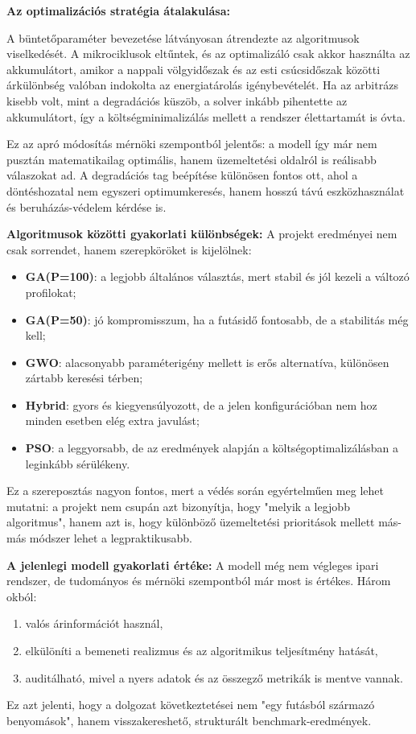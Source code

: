 \textbf{Az optimalizációs stratégia átalakulása:}

A büntetőparaméter bevezetése látványosan átrendezte az algoritmusok viselkedését. A mikrociklusok eltűntek, és az optimalizáló csak akkor használta az akkumulátort, amikor a nappali völgyidőszak és az esti csúcsidőszak közötti árkülönbség valóban indokolta az energiatárolás igénybevételét. Ha az arbitrázs kisebb volt, mint a degradációs küszöb, a solver inkább pihentette az akkumulátort, így a költségminimalizálás mellett a rendszer élettartamát is óvta.

Ez az apró módosítás mérnöki szempontból jelentős: a modell így már nem pusztán matematikailag optimális, hanem üzemeltetési oldalról is reálisabb válaszokat ad. A degradációs tag beépítése különösen fontos ott, ahol a döntéshozatal nem egyszeri optimumkeresés, hanem hosszú távú eszközhasználat és beruházás-védelem kérdése is.

\textbf{Algoritmusok közötti gyakorlati különbségek:}
A projekt eredményei nem csak sorrendet, hanem szerepköröket is kijelölnek:
\begin{itemize}
	\item \textbf{GA(P=100)}: a legjobb általános választás, mert stabil és jól kezeli a változó profilokat;
	\item \textbf{GA(P=50)}: jó kompromisszum, ha a futásidő fontosabb, de a stabilitás még kell;
	\item \textbf{GWO}: alacsonyabb paraméterigény mellett is erős alternatíva, különösen zártabb keresési térben;
	\item \textbf{Hybrid}: gyors és kiegyensúlyozott, de a jelen konfigurációban nem hoz minden esetben elég extra javulást;
	\item \textbf{PSO}: a leggyorsabb, de az eredmények alapján a költségoptimalizálásban a leginkább sérülékeny.
\end{itemize}

Ez a szereposztás nagyon fontos, mert a védés során egyértelműen meg lehet mutatni: a projekt nem csupán azt bizonyítja, hogy "melyik a legjobb algoritmus", hanem azt is, hogy különböző üzemeltetési prioritások mellett más-más módszer lehet a legpraktikusabb.

\textbf{A jelenlegi modell gyakorlati értéke:}
A modell még nem végleges ipari rendszer, de tudományos és mérnöki szempontból már most is értékes. Három okból:
\begin{enumerate}
	\item valós árinformációt használ,
	\item elkülöníti a bemeneti realizmus és az algoritmikus teljesítmény hatását,
	\item auditálható, mivel a nyers adatok és az összegző metrikák is mentve vannak.
\end{enumerate}

Ez azt jelenti, hogy a dolgozat következtetései nem "egy futásból származó benyomások", hanem visszakereshető, strukturált benchmark-eredmények.

